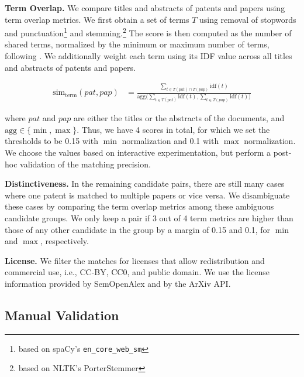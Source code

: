 \noindent\textbf{Term Overlap.} We compare titles and abstracts of patents and papers using term overlap metrics.
We first obtain a set of terms $T$ using removal of stopwords and punctuation\footnote{based on spaCy's \texttt{en\_core\_web\_sm}} and stemming.\footnote{based on NLTK's PorterStemmer}
The score is then computed as the number of shared terms, normalized by the minimum or maximum number of terms, following \citet{magermanDoesInvolvementPatenting2015}. We additionally weight each term using its IDF value across all titles and abstracts of patents and papers.
\par\noindent
{
  \small
  \setlength{\abovedisplayskip}{0pt}
  \setlength{\abovedisplayshortskip}{0pt}
  \begin{align*}
    \text{sim}_\text{term}(pat, pap) & = \frac{
      \displaystyle\sum_{t \in T(pat) \cap T(pap)} \text{idf}(t)
    }{
      \displaystyle\text{agg}\Big(\sum_{t \in T(pat)} \text{idf}(t), \sum_{t \in T(pap)} \text{idf}(t)\Big)
    }
  \end{align*}
  \par
}
\noindent where $pat$ and $pap$ are either the titles or the abstracts of the documents, and $\text{agg}\in\{\min, \max\}$.
Thus, we have 4 scores in total, for which we set the thresholds to be 0.15 with $\min$ normalization and 0.1 with $\max$ normalization.
We choose the values based on interactive experimentation, but perform a post-hoc validation of the matching precision.

\noindent\textbf{Distinctiveness. }
In the remaining candidate pairs, there are still many cases where one patent is matched to multiple papers or vice versa. We disambiguate these cases by comparing the term overlap metrics among these ambiguous candidate groups. We only keep a pair if 3 out of 4 term metrics are higher than those of any other candidate in the group by a margin of 0.15 and 0.1, for $\min$ and $\max$, respectively.

\noindent\textbf{License. } We filter the matches for licenses that allow redistribution and commercial use, i.e., 
CC-BY,%
CC0,%
and public domain.
We use the license information provided by SemOpenAlex and by the ArXiv API.

\subsection{Manual Validation}\label{sec:validation}

